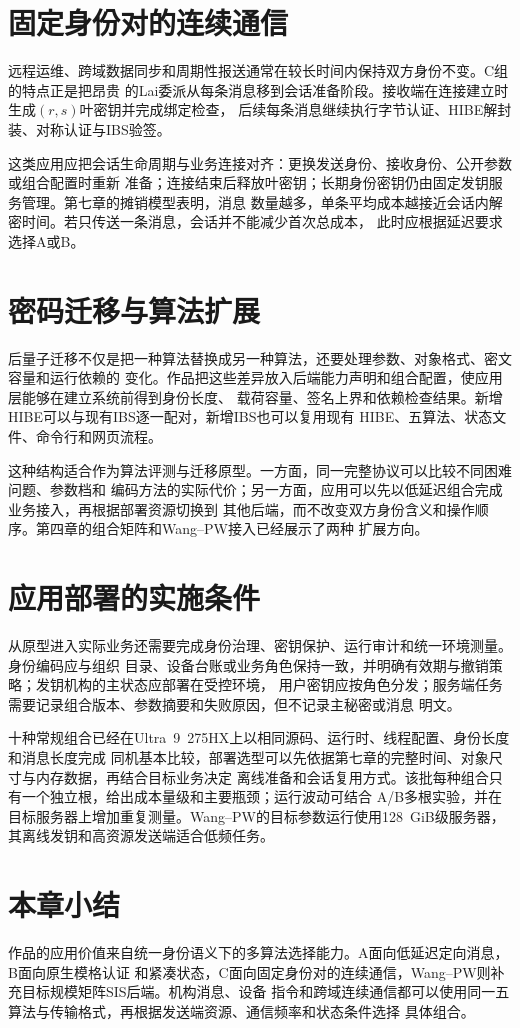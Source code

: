 \section{固定身份对的连续通信}

远程运维、跨域数据同步和周期性报送通常在较长时间内保持双方身份不变。C组的特点正是把昂贵
的Lai委派从每条消息移到会话准备阶段。接收端在连接建立时生成$(r,s)$叶密钥并完成绑定检查，
后续每条消息继续执行字节认证、HIBE解封装、对称认证与IBS验签。

这类应用应把会话生命周期与业务连接对齐：更换发送身份、接收身份、公开参数或组合配置时重新
准备；连接结束后释放叶密钥；长期身份密钥仍由固定发钥服务管理。第七章的摊销模型表明，消息
数量越多，单条平均成本越接近会话内解密时间。若只传送一条消息，会话并不能减少首次总成本，
此时应根据延迟要求选择A或B。

\section{密码迁移与算法扩展}

后量子迁移不仅是把一种算法替换成另一种算法，还要处理参数、对象格式、密文容量和运行依赖的
变化。作品把这些差异放入后端能力声明和组合配置，使应用层能够在建立系统前得到身份长度、
载荷容量、签名上界和依赖检查结果。新增HIBE可以与现有IBS逐一配对，新增IBS也可以复用现有
HIBE、五算法、状态文件、命令行和网页流程。

这种结构适合作为算法评测与迁移原型。一方面，同一完整协议可以比较不同困难问题、参数档和
编码方法的实际代价；另一方面，应用可以先以低延迟组合完成业务接入，再根据部署资源切换到
其他后端，而不改变双方身份含义和操作顺序。第四章的组合矩阵和Wang--PW接入已经展示了两种
扩展方向。

\section{应用部署的实施条件}

从原型进入实际业务还需要完成身份治理、密钥保护、运行审计和统一环境测量。身份编码应与组织
目录、设备台账或业务角色保持一致，并明确有效期与撤销策略；发钥机构的主状态应部署在受控环境，
用户密钥应按角色分发；服务端任务需要记录组合版本、参数摘要和失败原因，但不记录主秘密或消息
明文。

十种常规组合已经在Ultra~9~275HX上以相同源码、运行时、线程配置、身份长度和消息长度完成
同机基本比较，部署选型可以先依据第七章的完整时间、对象尺寸与内存数据，再结合目标业务决定
离线准备和会话复用方式。该批每种组合只有一个独立根，给出成本量级和主要瓶颈；运行波动可结合
A/B多根实验，并在目标服务器上增加重复测量。Wang--PW的目标参数运行使用128~GiB级服务器，
其离线发钥和高资源发送端适合低频任务。

\section{本章小结}

作品的应用价值来自统一身份语义下的多算法选择能力。A面向低延迟定向消息，B面向原生模格认证
和紧凑状态，C面向固定身份对的连续通信，Wang--PW则补充目标规模矩阵SIS后端。机构消息、设备
指令和跨域连续通信都可以使用同一五算法与传输格式，再根据发送端资源、通信频率和状态条件选择
具体组合。
